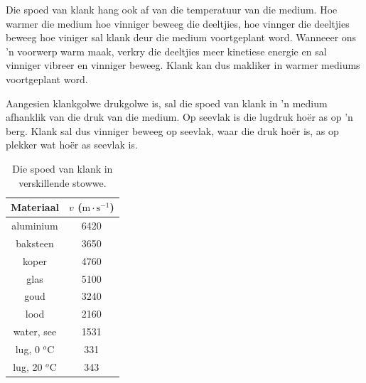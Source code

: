 
\begin{minipage}[t]{.5\textwidth}
Die spoed van klank hang ook af van die temperatuur van die medium. Hoe warmer die medium hoe vinniger beweeg die deeltjies, hoe vinnger die deeltjies beweeg hoe viniger sal klank deur die medium voortgeplant word. Wanneeer ons 'n voorwerp warm maak, verkry die deeltjies meer kinetiese energie en sal vinniger vibreer en vinniger beweeg. Klank kan dus makliker in warmer mediums voortgeplant word.\par  

Aangesien klankgolwe drukgolwe is, sal die spoed van klank in 'n medium afhanklik van die druk van die medium. Op seevlak is die lugdruk ho\"{e}r as op 'n berg. Klank sal dus vinniger beweeg op seevlak, waar die druk ho\"{e}r is, as op plekker wat ho\"{e}r as seevlak is.  
\end{minipage}
\begin{minipage}[t]{.5\textwidth}
\begin{center}
\begin{table}[H]
\centering
 \begin{tabular}{|c|c|}\hline
Materiaal	& $v$ ($\text{m}\cdot \text{s}^{-1}$)\\ \hline \hline
aluminium	&6420 \\ \hline
baksteen	&3650 \\ \hline
koper	&4760	 	 \\ \hline
glas &5100	 \\ \hline 	 	 
goud	&3240	 \\ \hline 	
lood	&2160	 \\ \hline 
water, see	&1531 \\ \hline
lug, 0 $^o$C&331 \\ \hline
lug, 20 $^o$C&343 \\ \hline
\end{tabular}
\caption{Die spoed van klank in verskillende stowwe.}
\end{table}
\end{center}
\end{minipage}


